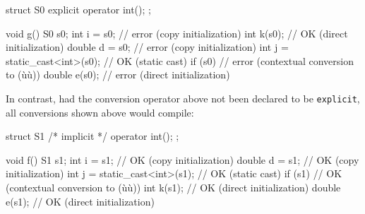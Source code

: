 \begin{emcppslisting}[language=C++]
struct S0 { explicit operator int(); };

void g()
{
    S0 s0;
    int i = s0;                    // error (copy initialization)
    int k(s0);                     // OK (direct initialization)
    double d = s0;                 // error (copy initialization)
    int j = static_cast<int>(s0);  // OK (static cast)
    if (s0) { }                    // error (contextual conversion to (ù{}ù))
    double e(s0);                  // error (direct initialization)
}
\end{emcppslisting}
    
\noindent In contrast, had the conversion operator above not been declared to be
\lstinline!explicit!, all conversions shown above would compile:

\begin{emcppslisting}[language=C++]
struct S1 { /* implicit */ operator int(); };

void f()
{
    S1 s1;
    int i = s1;                    // OK (copy initialization)
    double d = s1;                 // OK (copy initialization)
    int j = static_cast<int>(s1);  // OK (static cast)
    if (s1) { }                    // OK (contextual conversion to (ù{}ù))
    int k(s1);                     // OK (direct initialization)
    double e(s1);                  // OK (direct initialization)
}
\end{emcppslisting}
    
